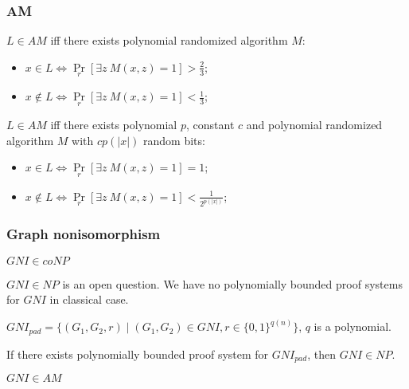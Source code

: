 \begin{frame}
    \frametitle{AM}
    
    \begin{definition}
    	$L \in AM$ iff there exists polynomial randomized algorithm
        $M$:
        \begin{itemize}
			\item $x \in L \Leftrightarrow
        		\Pr\limits_{r}[\exists z~ M(x, z) = 1] 
        		> \frac{2}{3}$;
            \item $x \notin L \Leftrightarrow
        		\Pr\limits_{r}[\exists z~ M(x, z) = 1] 
        		< \frac{1}{3}$;
        \end{itemize}
    \end{definition}

    \pause
    \begin{theorem}
        $L \in AM$ iff there exists polynomial $p$, constant $c$ and
        polynomial randomized algorithm $M$ with $c p(|x|)$ random
        bits:
        \begin{itemize}
			\item $x \in L \Leftrightarrow
        		\Pr\limits_{r}[\exists z~ M(x, z) = 1] = 1$;
            \item $x \notin L \Leftrightarrow
        		\Pr\limits_{r}[\exists z~ M(x, z) = 1] 
        		< \frac{1}{2^{p(|x|)}}$;
        \end{itemize}
    \end{theorem}
\end{frame}

\begin{frame}
    \frametitle{Graph nonisomorphism}

    $GNI \in coNP$
    
    $GNI \in NP$ is an open question. We have no polynomially bounded proof systems
    for $GNI$ in classical case.

	\pause
    \begin{definition}
        $GNI_{pad} = \{(G_1, G_2, r) \mid (G_1, G_2) \in GNI,
        r \in \{0, 1\}^{q(n)}\}$, $q$ is a polynomial.
    \end{definition}

    \pause
    \begin{lemma}
        If there exists polynomially bounded proof system for
        $GNI_{pad}$, then $GNI \in NP$.
    \end{lemma}

    \pause
    \begin{theorem}
    	$GNI \in AM$    
    \end{theorem}
\end{frame}

